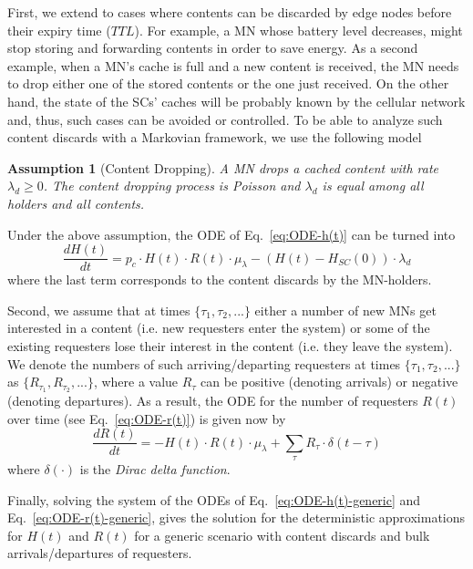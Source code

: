 \documentclass[10pt,conference,letterpaper]{IEEEtran}
\newtheorem{assumption}{Assumption}
\newcommand{\eq}[1]{Eq.~\eqref{#1}}
\begin{document}
First, we extend to cases where contents can be discarded by edge nodes before their expiry time ($TTL$). For example, a MN whose battery level decreases, might stop storing and forwarding contents in order to save energy. As a second example, when a MN's cache is full and a new content is received, the MN needs to drop either one of the stored contents or the one just received. On the other hand, the state of the SCs' caches will be probably known by the cellular network and, thus, such cases can be avoided or controlled. To be able to analyze such content discards with a Markovian framework, we use the following model
\begin{assumption}[Content Dropping]\label{ass:dropping} A MN drops a cached content with rate $\lambda_{d}\geq0$. The content dropping process is Poisson and $\lambda_{d}$ is equal among all holders and all contents.
\end{assumption}
Under the above assumption, the ODE of \eq{eq:ODE-h(t)} can be turned into
\begin{equation}\label{eq:ODE-h(t)-generic}
\frac{dH(t)}{dt} = p_{c}\cdot H(t)\cdot R(t)\cdot \mu_{\lambda} - (H(t)-H_{SC}(0))\cdot \lambda_{d}
\end{equation}
where the last term corresponds to the content discards by the MN-holders.

Second, we assume that at times $\{\tau_{1}, \tau_{2}, ...\}$ either a number of new MNs get interested in a content (i.e. new requesters enter the system) or some of the existing requesters lose their interest in the content (i.e. they leave the system). We denote the numbers of such arriving/departing requesters at times $\{\tau_{1}, \tau_{2}, ...\}$ as $\{R_{\tau_{1}}, R_{\tau_{2}}, ...\}$, where a value $R_{\tau}$ can be positive (denoting arrivals) or negative (denoting departures). As a result, the ODE for the number of requesters $R(t)$ over time (see \eq{eq:ODE-r(t)}) is given now by
\begin{equation}\label{eq:ODE-r(t)-generic}
\frac{dR(t)}{dt} = -H(t)\cdot R(t)\cdot \mu_{\lambda} + \sum_{\tau}R_{\tau}\cdot\delta(t-\tau)
\end{equation}
where $\delta(\cdot)$ is the \textit{Dirac delta function}.

Finally, solving the system of the ODEs of \eq{eq:ODE-h(t)-generic} and \eq{eq:ODE-r(t)-generic}, gives the solution for the deterministic approximations for $H(t)$ and $R(t)$ for a generic scenario with content discards and bulk arrivals/departures of requesters.
\end{document}
